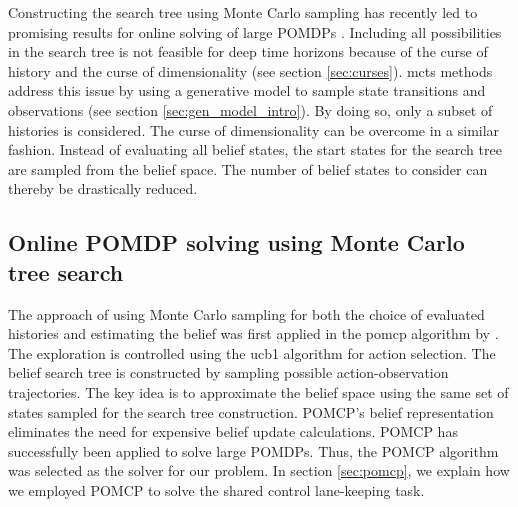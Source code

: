Constructing the search tree using Monte Carlo sampling has recently led to promising results for online solving of large POMDPs \parencite{pomcp}. Including all possibilities in the search tree is not feasible for deep time horizons because of the curse of history and the curse of dimensionality (see section \ref{sec:curses}). \gls{mcts} methods address this issue by using a generative model to sample state transitions and observations (see section \ref{sec:gen_model_intro}). By doing so, only a subset of histories is considered. The curse of dimensionality can be overcome in a similar fashion. Instead of evaluating all belief states, the start states for the search tree are sampled from the belief space. The number of belief states to consider can thereby be drastically reduced. 

\subsection{Online POMDP solving using Monte Carlo tree search}

The approach of using Monte Carlo sampling for both the choice of evaluated histories and estimating the belief was first applied in the \acrfull{pomcp} algorithm by \cite{pomcp}. The exploration is controlled using the \gls{ucb1} \parencite{ucb1} algorithm for action selection. The belief search tree is constructed by sampling possible action-observation trajectories. The key idea is to approximate the belief space using the same set of states sampled for the search tree construction. POMCP's belief representation eliminates the need for expensive belief update calculations. POMCP has successfully been applied to solve large POMDPs. Thus, the POMCP algorithm was selected as the solver for our problem. In section \ref{sec:pomcp}, we explain how we employed POMCP to solve the shared control lane-keeping task. 


